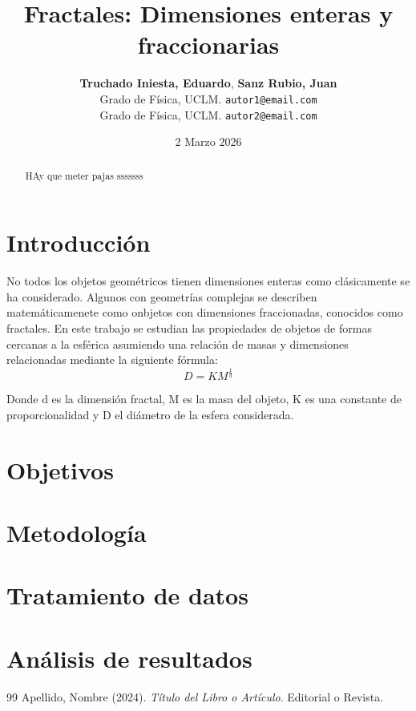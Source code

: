 \documentclass[11pt, a4paper, twocolumn]{article}
\title{\textbf{\Large Fractales: Dimensiones enteras y fraccionarias}}
\author{
    \textbf{Truchado Iniesta, Eduardo}, \textbf{Sanz Rubio, Juan} \\
    \small Grado de Física, UCLM. \texttt{autor1@email.com} \\
    \small Grado de Física, UCLM. \texttt{autor2@email.com}
}
\date{\small 2 Marzo 2026}
\begin{document}
\maketitle
\thispagestyle{fancy}

\begin{abstract}
HAy que meter pajas sssssss
\end{abstract}

\section{Introducción}
No todos los objetos geométricos tienen dimensiones enteras como clásicamente se ha considerado. Algunos con geometrías complejas se describen matemáticamenete como onbjetos con dimensiones fraccionadas,
conocidos como fractales. En este trabajo se estudian las propiedades de objetos de formas cercanas a la esférica asumiendo una relación de masas y dimensiones relacionadas mediante la siguiente fórmula: 
\begin{equation}
    D = K M ^{\frac{1}{d}}
\end{equation}

Donde d es la dimensión fractal, M es la masa del objeto, K es una constante de proporcionalidad y D el diámetro de la esfera considerada.

\section{Objetivos}

\section{Metodología}

\section{Tratamiento de datos}

\section{Análisis de resultados}
\begin{thebibliography}{99}
Apellido, Nombre (2024). \textit{Título del Libro o Artículo}. Editorial o Revista.
\end{thebibliography}
\end{document}
